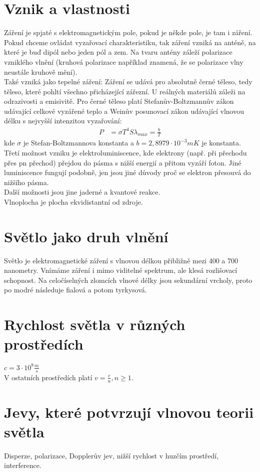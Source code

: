 \documentclass[titlepage]{report}
\begin{document}
\section{Vznik a vlastnosti}
Záření je spjaté s elektromagnetickým pole, pokud je někde pole, je tam i záření. Pokud chceme ovládat vyzařovací charakteristiku, tak záření vzniká na anténě, na které je buď dipól nebo jeden pól a zem. Na tvaru antény záleží polarizace vzniklého vlnění (kruhová polarizace například znamená, že se polarizace vlny neustále kruhově mění).\\
Také vzniká jako tepelné záření: Záření se udává pro absolutně černé těleso, tedy těleso, které pohltí všechno přicházející zářezní. U reálných materiálů záleži na odrazivosti a emisivitě. Pro černé těleso platí Stefanův-Boltzmannův zákon udávající celkové vyzářené teplo a Weinův posunovací zákon udávající vlnovou délku s nejvyšší intenzitou vyzařování:
\begin{align}
P &= \sigma T^4 S
\lambda_{max} = \frac{b}{T}
\end{align}
kde $\sigma$ je Stefan-Boltzmannova konstanta a $b = 2,8979 \cdot 10^{-3} mK$ je konstanta.\\
Třetí možnost vzniku je elektroluminiscence, kde elektrony (např. při přechodu přes pn přechod) přejdou do pásma s nižší energií a přitom vyzáří foton. Jiné luminiscence fungují podobně, jen jsou jiné důvody proč se elektron přesouvá do nižšího pásma.\\
Další možnosti jsou jine jaderné a kvantové reakce.\\
Vlnoplocha je plocha ekvidistantní od zdroje.
\section{Světlo jako druh vlnění}
Světlo je elektromagnetické záření s vlnovou délkou přibližně mezi 400 a 700 nanometry. Vnímáme záření i mimo viditelné spektrum, ale klesá rozlišovací schopnost. Na celočíselných zlomcích vlnové délky jsou sekundární vrcholy, proto po modré následuje fialová a potom tyrkysová.
\section{Rychlost světla v různých prostředích}
$c = 3 \cdot 10^8 \frac{m}{s}$\\
V ostatních prostředích platí $v = \frac{c}{n}, n \geq 1$.
\section{Jevy, které potvrzují vlnovou teorii světla}
Disperze, polarizace, Dopplerův jev, nižší rychlost v huzčím prostředí, interference.
\end{document}
